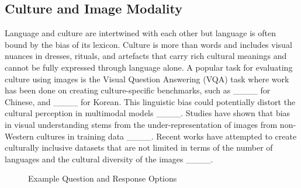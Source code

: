 \subsection{Culture and Image Modality}
Language and culture are intertwined with each other but language is often bound by the bias of its lexicon. 
Culture is more than words and includes visual nuances in dresses, rituals, and artefacts that carry rich cultural meanings and cannot be fully expressed through language alone. A popular task for evaluating culture using images is the Visual Question Answering (VQA) task where work has been done on creating culture-specific benchmarks, such as ____ for Chinese, and ____ for Korean. This linguistic bias could potentially distort the cultural perception in multimodal models ____. Studies have shown that bias in visual understanding stems from the under-representation of images from non-Western cultures in training data ____. Recent works have attempted to create culturally inclusive datasets that are not limited in terms of the number of languages and the cultural diversity of the images ____. 




\begin{figure}[ht]
\centering
\scriptsize
\caption{Example Question and Response Options}
\label{fig:question-options}
\end{figure}


